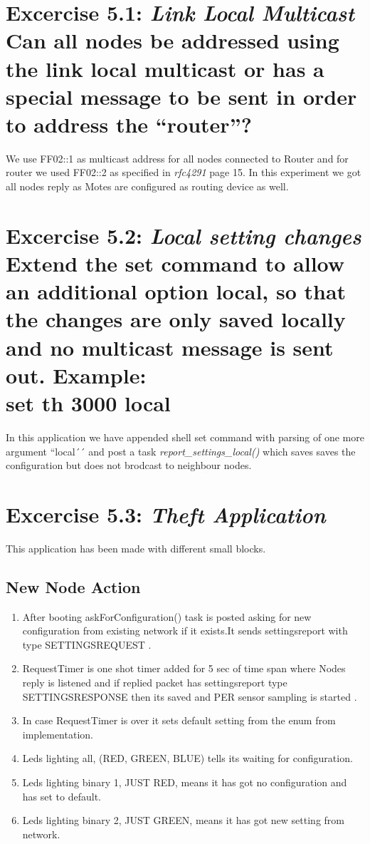 \documentclass[11pt]{article} %
\begin{document}
\section*{Excercise 5.1: \textnormal{\large{\textit{Link Local Multicast} Can all nodes be addressed using the link
local multicast or has a special message to be sent in order to address the “router”? }}}

We use FF02::1 as multicast address for all nodes connected to Router and for router we used FF02::2 as specified in \textit{rfc4291} page 15.
In this experiment we got all nodes reply as Motes are configured as routing device as well.  


\section*{Excercise 5.2: \textnormal{\large{\textit{Local setting changes} Extend the set command to allow an additional
option local, so that the changes are only saved locally and no multicast
message is sent out. Example: \\
\textbf{set th 3000 local} }}}

In this application we have appended shell set command with parsing of one more argument ``local´´ and post a task \textit{ report\_settings\_local() } which saves saves the configuration but does not brodcast to neighbour nodes.

\section*{Excercise 5.3: \textnormal{\large{\textit{Theft Application} }}}
This application has been made with different small blocks. 
\subsection*{New Node Action}
\begin{enumerate}
\item After booting askForConfiguration() task is posted asking for new configuration from existing network if it exists.It sends settings\textunderscore report with type SETTINGS\textunderscore REQUEST .
\item RequestTimer is one shot timer added for 5 sec of time span where Nodes reply is listened and if replied packet has settings\textunderscore report type SETTINGS\textunderscore RESPONSE then its saved and PER sensor sampling is started .
\item In case RequestTimer is over it sets default setting from the enum from implementation.
\item Leds lighting all, (RED, GREEN, BLUE) tells its waiting for configuration.
\item Leds lighting binary 1, JUST RED, means it has got no configuration and has set to default.
\item Leds lighting binary 2, JUST GREEN, means it has got new setting from network.
\end{enumerate}
\end{document}
